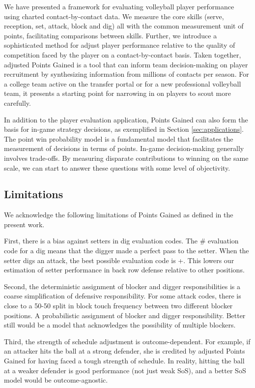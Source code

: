 \documentclass[USenglish]{article}
\theoremstyle{dgthm}
\theoremstyle{dgdef}
\begin{document}
We have presented a framework for evaluating volleyball player performance using charted contact-by-contact data. We measure the core skills (serve, reception, set, attack, block and dig) all with the common measurement unit of points, facilitating comparisons between skills. Further, we introduce a sophisticated method for adjust player performance relative to the quality of competition faced by the player on a contact-by-contact basis. Taken together, adjusted Points Gained is a tool that can inform team decision-making on player recruitment by synthesizing information from millions of contacts per season. For a college team active on the transfer portal or for a new professional volleyball team, it presents a starting point for narrowing in on players to scout more carefully.

In addition to the player evaluation application, Points Gained can also form the basis for in-game strategy decisions, as exemplified in Section \ref{sec:applications}. The point win probability model is a fundamental model that facilitates the measurement of decisions in terms of points. In-game decision-making generally involves trade-offs. By measuring disparate contributions to winning on the same scale, we can start to answer these questions with some level of objectivity.


\subsection{Limitations}
\label{sec:limitations}

We acknowledge the following limitations of Points Gained as defined in the present work.

First, there is a bias against setters in dig evaluation codes. The \# evaluation code for a dig means that the digger made a perfect pass to the setter. When the setter digs an attack, the best possible evaluation code is +. This lowers our estimation of setter performance in back row defense relative to other positions.

Second, the deterministic assignment of blocker and digger responsibilities is a coarse simplification of defensive responsibility. For some attack codes, there is close to a 50-50 split in block touch frequency between two different blocker positions. A probabilistic assignment of blocker and digger responsibility. Better still would be a model that acknowledges the possibility of multiple blockers.

Third, the strength of schedule adjustment is outcome-dependent. For example, if an attacker hits the ball at a strong defender, she is credited by adjusted Points Gained for having faced a tough strength of schedule. In reality, hitting the ball at a weaker defender is good performance (not just weak SoS), and a better SoS model would be outcome-agnostic.
\end{document}
